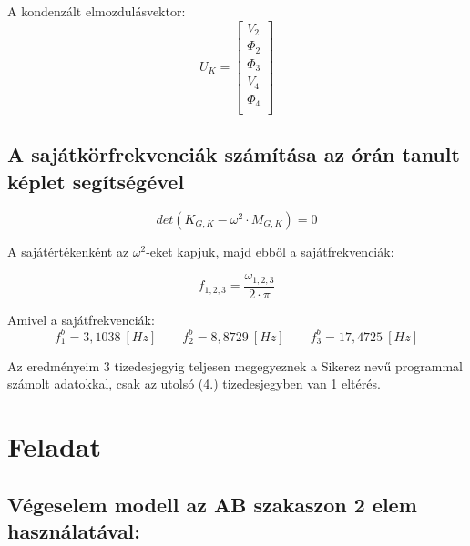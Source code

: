 \documentclass{article}
\newcommand{\rpm}{\raisebox{.2ex}{$\scriptstyle\pm$}}
\begin{document}
			A kondenzált elmozdulásvektor:
			\begin{equation}
				U_K=
				\begin{bmatrix}
				V_{2}    \\
				\Phi_{2} \\
				\Phi_{3} \\
				V_{4}    \\
				\Phi_{4} \\
				\end{bmatrix}
			\end{equation} 
	
	\subsection{A sajátkörfrekvenciák számítása az órán tanult képlet segítségével}
	
		\begin{equation}
			det(K_{G,K} - \omega^2 \cdot M_{G,K}) = 0
		\end{equation}
		
		A sajátértékenként az $\omega^2$-eket kapjuk, majd ebből a sajátfrekvenciák:
		
		\begin{equation}
			f_{1,2,3}=\frac{\omega_{1,2,3}}{2\cdot \pi}
		\end{equation}
		
		Amivel a sajátfrekvenciák:	
		\[f_1^b=3,1038~[Hz] \qquad f_2^b=8,8729~[Hz] \qquad f_3^b=17,4725~[Hz]  \]
		
		Az eredményeim 3 tizedesjegyig teljesen megegyeznek a Sikerez nevű programmal számolt adatokkal, csak az utolsó (4.) tizedesjegyben van \rpm1 eltérés. 
	
	\section{Feladat}
	
		\subsection{Végeselem modell az \textbf{AB} szakaszon 2 elem használatával:}
	
\end{document}
